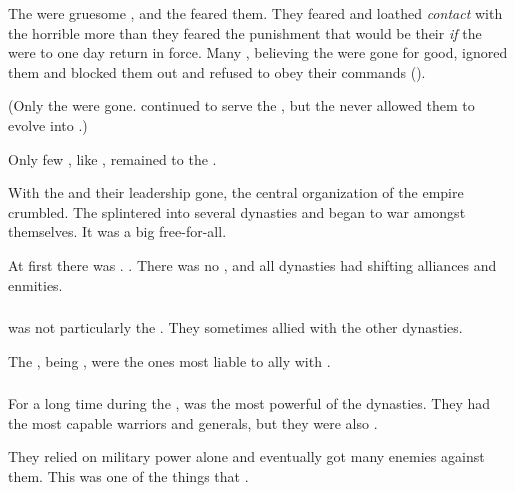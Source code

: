 The \banelords{} were gruesome , and the \resphain{} feared them. 
They feared and loathed \emph{contact} with the horrible \banes{} more than they feared the punishment that would be their \emph{if} the \banes{} were to one day return in force. 
Many \resphain, believing the \banelords{} were gone for good, ignored them and blocked them out and refused to obey their commands (). 

(Only the \banelords{} were gone. 
\Lesserbanes{} continued to serve the \resphain, but the \resphain{} never allowed them to evolve into \banelords.) 

Only few \resphain, like , remained  to the \banelords. 

With the \banes{} and their leadership gone, the central organization of the \resphan{} empire crumbled.
The \resphain{} splintered into several dynasties and began to war amongst themselves. 
It was a big free-for-all. 

At first there was . 
. 
There was no , and all dynasties had shifting alliances and enmities. 





\subsubsection{\Kezerad}
\Kezerad was not particularly the . 
They sometimes allied with the other dynasties. 

The \TiphredSerah{}, being , were the ones most liable to ally with \Kezerad. 





\subsubsection{\Mystraacht}
For a long time during the \resphanwars, \Mystraacht{} was the most powerful of the dynasties. 
They had the most capable warriors and generals, but they were also . 

They relied on military power alone and eventually got many enemies against them. 
This was one of the things that . 





